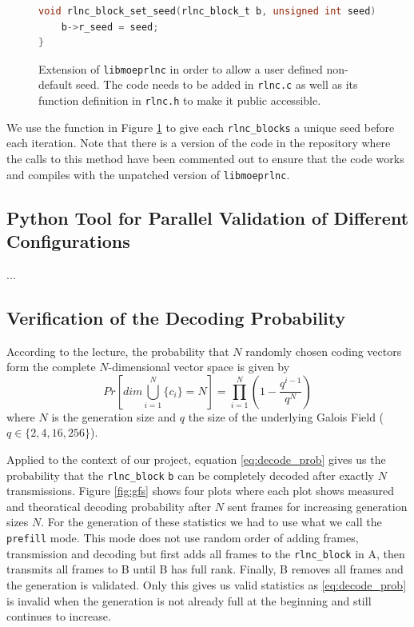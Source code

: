 \documentclass[a4paper,english,10pt]{tumarticle}
\begin{document}
\begin{figure}[h]
  \begin{lstlisting}[language=C]
void rlnc_block_set_seed(rlnc_block_t b, unsigned int seed){
    b->r_seed = seed;
}
\end{lstlisting}
  \caption[]{Extension of \texttt{libmoeprlnc} in order to allow a user defined non-default seed. The code needs to be added in \texttt{rlnc.c} as well as 
  its function definition in \texttt{rlnc.h} to make it public accessible.}
  \label{code}
\end{figure}

We use the function in Figure \ref{code} to give each \texttt{rlnc\_blocks} a unique seed before each iteration.
Note that there is a version of the code in the repository where the calls to this method 
have been commented out to ensure that the code works and compiles with the unpatched version of \texttt{libmoeprlnc}.



\subsection{Python Tool for Parallel Validation of Different Configurations}
...

\subsection{Verification of the Decoding Probability}
According to the lecture, the probability that $N$ randomly chosen coding vectors form
the complete $N$-dimensional vector space is given by %
\begin{equation} 
  Pr[dim\bigcup_{i=1}^{N}\{c_i\} = N] = \prod_{i=1}^{N} (1 - \frac{q^{i - 1}}{q ^ {N}})
  \label{eq:decode_prob}
\end{equation}
where $N$ is the generation size and $q$ the size of the underlying Galois Field ($q \in \{2,4,16,256\}$).

Applied to the context of our project, equation \eqref{eq:decode_prob} gives us
the probability that the \texttt{rlnc\_block} \texttt{b} can be completely
decoded after exactly $N$ transmissions. Figure \ref{fig:gfs} shows four plots
where each plot shows measured and theoratical decoding probability after $N$
sent frames for increasing generation sizes $N$. For the generation of these
statistics we had to use what we call the \texttt{prefill} mode. This mode does
not use random order of adding frames, transmission and decoding but first adds
all frames to the \texttt{rlnc\_block} in A, then transmits all frames to B
until B has full rank. Finally, B removes all frames and the generation is
validated. Only this gives us valid statistics as \eqref{eq:decode_prob} is
invalid when the generation is not already full at the beginning and still
continues to increase.
\end{document}
